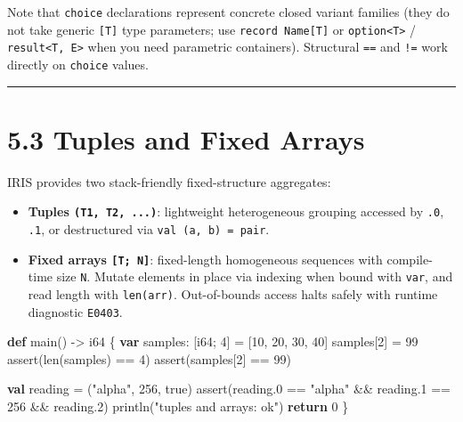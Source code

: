 \documentclass[
  english,
  oneside]{book}
\newenvironment{Shaded}{\begin{snugshade}}{\end{snugshade}}
\newcommand{\ConstantTok}[1]{\textcolor[rgb]{0.31,0.76,1.00}{#1}}
\newcommand{\ControlFlowTok}[1]{\textcolor[rgb]{0.77,0.53,0.75}{\textbf{#1}}}
\newcommand{\DataTypeTok}[1]{\textcolor[rgb]{0.31,0.79,0.69}{#1}}
\newcommand{\DecValTok}[1]{\textcolor[rgb]{0.71,0.81,0.66}{#1}}
\newcommand{\FunctionTok}[1]{\textcolor[rgb]{0.86,0.86,0.67}{#1}}
\newcommand{\KeywordTok}[1]{\textcolor[rgb]{0.34,0.61,0.84}{\textbf{#1}}}
\newcommand{\NormalTok}[1]{\textcolor[rgb]{0.83,0.83,0.83}{#1}}
\newcommand{\OperatorTok}[1]{\textcolor[rgb]{0.83,0.83,0.83}{#1}}
\newcommand{\StringTok}[1]{\textcolor[rgb]{0.81,0.57,0.47}{#1}}
\providecommand{\tightlist}{%
  \setlength{\itemsep}{0pt}\setlength{\parskip}{0pt}}
\begin{document}
Note that \texttt{choice} declarations represent concrete closed variant
families (they do not take generic \texttt{{[}T{]}} type parameters; use
\texttt{record\ Name{[}T{]}} or
\texttt{option\textless{}T\textgreater{}} /
\texttt{result\textless{}T,\ E\textgreater{}} when you need parametric
containers). Structural \texttt{==} and \texttt{!=} work directly on
\texttt{choice} values.

\begin{center}\rule{0.5\linewidth}{0.5pt}\end{center}

\section{5.3 Tuples and Fixed Arrays}\label{tuples-and-fixed-arrays}

IRIS provides two stack-friendly fixed-structure aggregates:

\begin{itemize}
\tightlist
\item
  \textbf{Tuples \texttt{(T1,\ T2,\ ...)}}: lightweight heterogeneous
  grouping accessed by \texttt{.0}, \texttt{.1}, or destructured via
  \texttt{val\ (a,\ b)\ =\ pair}.
\item
  \textbf{Fixed arrays \texttt{{[}T;\ N{]}}}: fixed-length homogeneous
  sequences with compile-time size \texttt{N}. Mutate elements in place
  via indexing when bound with \texttt{var}, and read length with
  \texttt{len(arr)}. Out-of-bounds access halts safely with runtime
  diagnostic \texttt{E0403}.
\end{itemize}

\begin{Shaded}
\begin{Highlighting}[]
\KeywordTok{def}\NormalTok{ main() }\OperatorTok{{-}\textgreater{}} \DataTypeTok{i64}\NormalTok{ \{}
    \KeywordTok{var}\NormalTok{ samples: [}\DataTypeTok{i64}\NormalTok{; }\DecValTok{4}\NormalTok{] }\OperatorTok{=}\NormalTok{ [}\DecValTok{10}\NormalTok{, }\DecValTok{20}\NormalTok{, }\DecValTok{30}\NormalTok{, }\DecValTok{40}\NormalTok{]}
\NormalTok{    samples[}\DecValTok{2}\NormalTok{] }\OperatorTok{=} \DecValTok{99}
    \FunctionTok{assert}\NormalTok{(}\FunctionTok{len}\NormalTok{(samples) }\OperatorTok{==} \DecValTok{4}\NormalTok{)}
    \FunctionTok{assert}\NormalTok{(samples[}\DecValTok{2}\NormalTok{] }\OperatorTok{==} \DecValTok{99}\NormalTok{)}

    \KeywordTok{val}\NormalTok{ reading }\OperatorTok{=}\NormalTok{ (}\StringTok{"alpha"}\NormalTok{, }\DecValTok{256}\NormalTok{, }\ConstantTok{true}\NormalTok{)}
    \FunctionTok{assert}\NormalTok{(reading}\OperatorTok{.}\DecValTok{0} \OperatorTok{==} \StringTok{"alpha"} \OperatorTok{\&\&}\NormalTok{ reading}\OperatorTok{.}\DecValTok{1} \OperatorTok{==} \DecValTok{256} \OperatorTok{\&\&}\NormalTok{ reading}\OperatorTok{.}\DecValTok{2}\NormalTok{)}
\NormalTok{    println(}\StringTok{"tuples and arrays: ok"}\NormalTok{)}
    \ControlFlowTok{return} \DecValTok{0}
\NormalTok{\}}
\end{Highlighting}
\end{Shaded}
\end{document}
